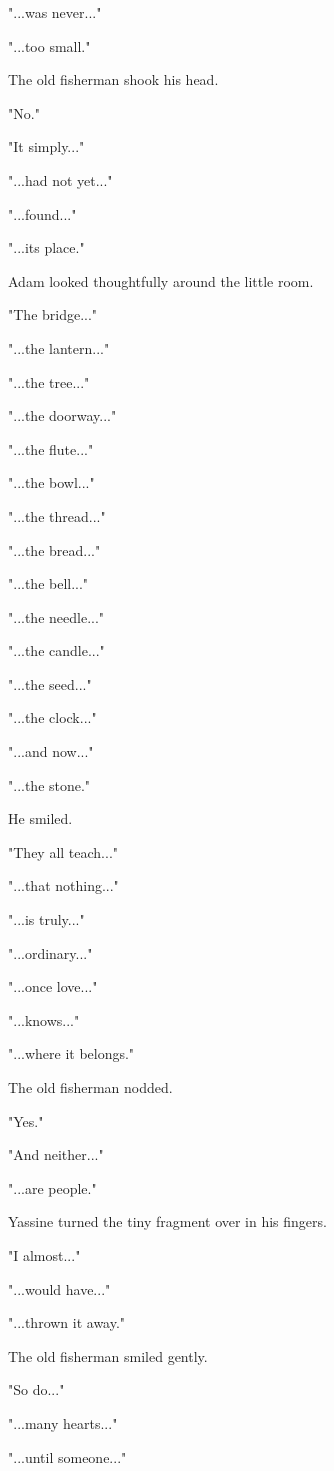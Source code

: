 \documentclass[12pt,openany]{book}
\begin{document}
"...was never..."

"...too small."

The old fisherman shook his head.

"No."

"It simply..."

"...had not yet..."

"...found..."

"...its place."

Adam looked thoughtfully around the little room.

"The bridge..."

"...the lantern..."

"...the tree..."

"...the doorway..."

"...the flute..."

"...the bowl..."

"...the thread..."

"...the bread..."

"...the bell..."

"...the needle..."

"...the candle..."

"...the seed..."

"...the clock..."

"...and now..."

"...the stone."

He smiled.

"They all teach..."

"...that nothing..."

"...is truly..."

"...ordinary..."

"...once love..."

"...knows..."

"...where it belongs."

The old fisherman nodded.

"Yes."

"And neither..."

"...are people."

Yassine turned the tiny fragment over in his fingers.

"I almost..."

"...would have..."

"...thrown it away."

The old fisherman smiled gently.

"So do..."

"...many hearts..."

"...until someone..."
\end{document}
